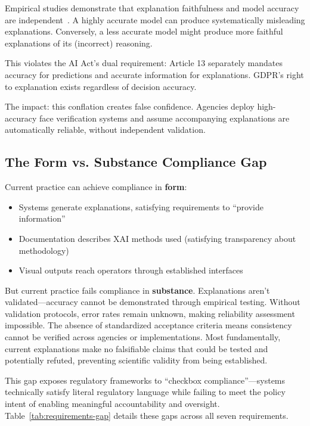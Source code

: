 Empirical studies demonstrate that explanation faithfulness and model accuracy are independent~\cite{adebayo2018sanity,kindermans2019reliability}. A highly accurate model can produce systematically misleading explanations. Conversely, a less accurate model might produce more faithful explanations of its (incorrect) reasoning.

This violates the AI Act's dual requirement: Article 13 separately mandates accuracy for predictions and accurate information for explanations. GDPR's right to explanation exists regardless of decision accuracy.

The impact: this conflation creates false confidence. Agencies deploy high-accuracy face verification systems and assume accompanying explanations are automatically reliable, without independent validation.

\subsection{The Form vs. Substance Compliance Gap}

Current practice can achieve compliance in \textbf{form}:
\begin{itemize}[itemsep=2pt]
    \item Systems generate explanations, satisfying requirements to ``provide information''
    \item Documentation describes XAI methods used (satisfying transparency about methodology)
    \item Visual outputs reach operators through established interfaces
\end{itemize}

But current practice fails compliance in \textbf{substance}. Explanations aren't validated—accuracy cannot be demonstrated through empirical testing. Without validation protocols, error rates remain unknown, making reliability assessment impossible. The absence of standardized acceptance criteria means consistency cannot be verified across agencies or implementations. Most fundamentally, current explanations make no falsifiable claims that could be tested and potentially refuted, preventing scientific validity from being established.

This gap exposes regulatory frameworks to ``checkbox compliance''—systems technically satisfy literal regulatory language while failing to meet the policy intent of enabling meaningful accountability and oversight. Table~\ref{tab:requirements-gap} details these gaps across all seven requirements.
